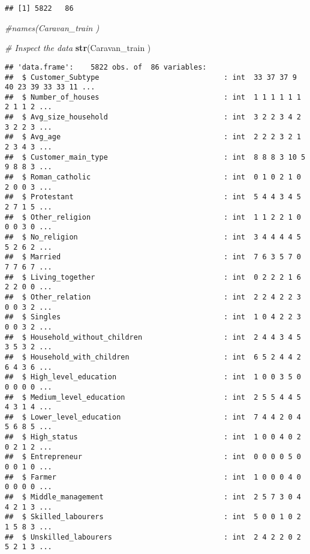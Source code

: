 \documentclass[]{article}
\newenvironment{Shaded}{\begin{snugshade}}{\end{snugshade}}
\newcommand{\KeywordTok}[1]{\textcolor[rgb]{0.13,0.29,0.53}{\textbf{#1}}}
\newcommand{\CommentTok}[1]{\textcolor[rgb]{0.56,0.35,0.01}{\textit{#1}}}
\newcommand{\NormalTok}[1]{#1}
\begin{document}
\begin{verbatim}
## [1] 5822   86
\end{verbatim}

\begin{Shaded}
\begin{Highlighting}[]
\CommentTok{#names(Caravan_train )}


\CommentTok{# Inspect the data }
\KeywordTok{str}\NormalTok{(Caravan_train )}
\end{Highlighting}
\end{Shaded}

\begin{verbatim}
## 'data.frame':    5822 obs. of  86 variables:
##  $ Customer_Subtype                             : int  33 37 37 9 40 23 39 33 33 11 ...
##  $ Number_of_houses                             : int  1 1 1 1 1 1 2 1 1 2 ...
##  $ Avg_size_household                           : int  3 2 2 3 4 2 3 2 2 3 ...
##  $ Avg_age                                      : int  2 2 2 3 2 1 2 3 4 3 ...
##  $ Customer_main_type                           : int  8 8 8 3 10 5 9 8 8 3 ...
##  $ Roman_catholic                               : int  0 1 0 2 1 0 2 0 0 3 ...
##  $ Protestant                                   : int  5 4 4 3 4 5 2 7 1 5 ...
##  $ Other_religion                               : int  1 1 2 2 1 0 0 0 3 0 ...
##  $ No_religion                                  : int  3 4 4 4 4 5 5 2 6 2 ...
##  $ Married                                      : int  7 6 3 5 7 0 7 7 6 7 ...
##  $ Living_together                              : int  0 2 2 2 1 6 2 2 0 0 ...
##  $ Other_relation                               : int  2 2 4 2 2 3 0 0 3 2 ...
##  $ Singles                                      : int  1 0 4 2 2 3 0 0 3 2 ...
##  $ Household_without_children                   : int  2 4 4 3 4 5 3 5 3 2 ...
##  $ Household_with_children                      : int  6 5 2 4 4 2 6 4 3 6 ...
##  $ High_level_education                         : int  1 0 0 3 5 0 0 0 0 0 ...
##  $ Medium_level_education                       : int  2 5 5 4 4 5 4 3 1 4 ...
##  $ Lower_level_education                        : int  7 4 4 2 0 4 5 6 8 5 ...
##  $ High_status                                  : int  1 0 0 4 0 2 0 2 1 2 ...
##  $ Entrepreneur                                 : int  0 0 0 0 5 0 0 0 1 0 ...
##  $ Farmer                                       : int  1 0 0 0 4 0 0 0 0 0 ...
##  $ Middle_management                            : int  2 5 7 3 0 4 4 2 1 3 ...
##  $ Skilled_labourers                            : int  5 0 0 1 0 2 1 5 8 3 ...
##  $ Unskilled_labourers                          : int  2 4 2 2 0 2 5 2 1 3 ...

\end{verbatim}
\end{document}
